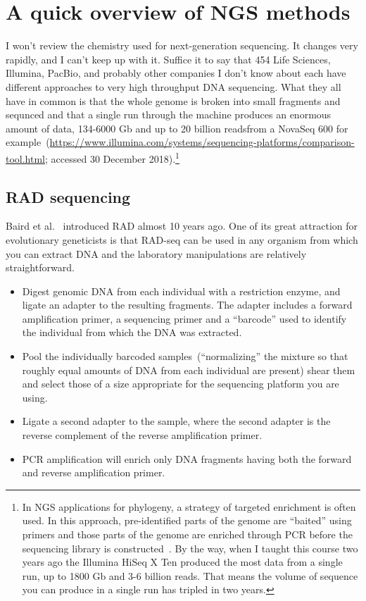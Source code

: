 \documentclass[12pt]{article}
\begin{document}
\section*{A quick overview of NGS methods}

I won't review the chemistry used for next-generation sequencing. It
changes very rapidly, and I can't keep up with it. Suffice it to say
that 454 Life Sciences, Illumina, PacBio, and probably other companies
I don't know about each have different approaches to very high
throughput DNA sequencing. What they all have in common is that the
whole genome is broken into small fragments and sequnced and that a
single run through the machine produces an enormous amount of data,
134-6000 Gb and up to 20 billion readsfrom a NovaSeq 600 for
example~(\url{https://www.illumina.com/systems/sequencing-platforms/comparison-tool.html};
accessed 30 December 2018).\footnote{In NGS applications for
  phylogeny, a strategy of targeted enrichment is often used. In this
  approach, pre-identified parts of the genome are ``baited'' using
  primers and those parts of the genome are enriched through PCR
  before the sequencing library is
  constructed~\cite{Lemmon-etal-2012}. By the way, when I taught this
  course two years ago the Illumina HiSeq X Ten produced the most data
  from a single run, up to 1800 Gb and 3-6 billion reads. That means
  the volume of sequence you can produce in a single run has tripled
  in two years.}

\subsection*{RAD sequencing}

Baird et al.~\cite{Baird-etal-2008} introduced RAD almost 10 years
ago. One of its great attraction for evolutionary geneticists is that
RAD-seq can be used in any organism from which you can extract DNA and
the laboratory manipulations are relatively straightforward.

\begin{itemize}

\item Digest genomic DNA from each individual with a restriction
  enzyme, and ligate an adapter to the resulting fragments. The
  adapter includes a forward amplification primer, a sequencing primer
  and a ``barcode'' used to identify the individual from which the DNA
  was extracted.

\item Pool the individually barcoded samples~(``normalizing'' the
  mixture so that roughly equal amounts of DNA from each individual
  are present) shear them and select those of a size appropriate for
  the sequencing platform you are using.

\item Ligate a second adapter to the sample, where the second adapter
  is the reverse complement of the reverse amplification primer. 

\item PCR amplification will enrich only DNA fragments having both the
  forward and reverse amplification primer.

\end{itemize}
\end{document}
